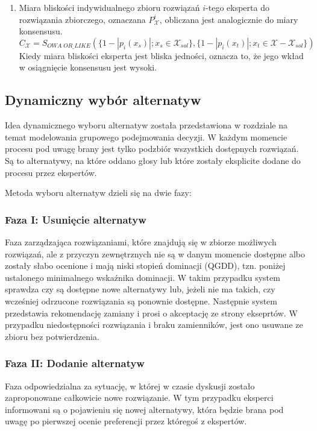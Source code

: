 \begin{enumerate}
  \item Miara bliskości indywidualnego zbioru rozwiązań $i$-tego eksperta do
  rozwiązania zbiorczego, oznaczana $P^i_{\mathcal{X}}$, obliczana jest
  analogicznie do miary konsensusu.
  \begin{equation}
  C_{\mathcal{X}} = S_{OWA \; OR\_LIKE}(\{ 1 - |p_i(x_s)|; x_s \in
  \mathcal{X}_{sol}\}, \{ 1 - |p_i(x_t)|; x_t \in \mathcal{X} -
  \mathcal{X}_{sol} \})
  \end{equation}
  Kiedy miara bliskości eksperta jest bliska jedności, oznacza to, że jego wkład
  w osiągnięcie konsensusu jest wysoki.
\end{enumerate}

\subsection{Dynamiczny wybór alternatyw}
Idea dynamicznego wyboru alternatyw została przedstawiona w rozdziale na temat
modelowania grupowego podejmowania decyzji. W każdym momencie procesu pod uwagę
brany jest tylko podzbiór wszystkich dostępnych rozwiązań. Są to alternatywy, na
które oddano głosy lub które zostały eksplicite dodane do procesu przez
ekspertów.

Metoda wyboru alternatyw dzieli się na dwie fazy:
  \subsubsection{Faza I: Usunięcie alternatyw} 
  Faza zarządzająca rozwiązaniami, które znajdują się w zbiorze możliwych
  rozwiązań, ale z przyczyn zewnętrznych nie są w danym momencie dostępne albo
  zostały słabo ocenione i mają niski stopień dominacji (QGDD), tzn. poniżej
  ustalonego minimalnego wskaźnika dominacji. W takim przypadku system sprawdza
  czy są dostępne nowe alternatywy lub, jeżeli nie ma takich, czy wcześniej
  odrzucone rozwiązania są ponownie dostępne. Następnie system przedstawia
  rekomendację zamiany i prosi o akceptację ze strony ekseprtów. W przypadku
  niedostępności rozwiązania i braku zamienników, jest ono usuwane ze zbioru bez
  potwierdzenia.
  
  \subsubsection{Faza II: Dodanie alternatyw}
  Faza odpowiedzialna za sytuację, w której w czasie dyskusji zostało
  zaproponowane całkowicie nowe rozwiązanie. W tym przypadku eksperci
  informowani są o pojawieniu się nowej alternatywy, która będzie brana pod
  uwagę po pierwszej ocenie preferencji przez któregoś z ekspertów.

